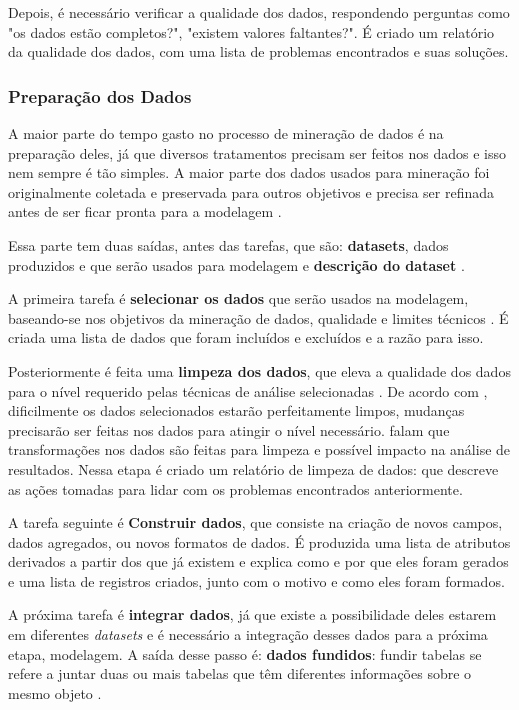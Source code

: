Depois, é necessário verificar a qualidade dos dados, respondendo perguntas como "os dados estão completos?", "existem valores faltantes?". É criado um relatório da qualidade dos dados, com uma lista de problemas encontrados e suas soluções.

\subsubsection{Preparação dos Dados}
A maior parte do tempo gasto no processo de mineração de dados é na preparação deles, já que diversos tratamentos precisam ser feitos nos dados e isso nem sempre é tão simples. A maior parte dos dados usados para mineração foi originalmente coletada e preservada para outros objetivos e precisa ser refinada antes de ser ficar pronta para a modelagem \citep{dmfd}.

Essa parte tem duas saídas, antes das tarefas, que são: \textbf{datasets}, dados produzidos e que serão usados para modelagem e \textbf{descrição do dataset} \citep{crispmanual}.

A primeira tarefa é \textbf{selecionar os dados} que serão usados na modelagem, baseando-se nos objetivos da mineração de dados, qualidade e limites técnicos \citep{crispmanual}. É criada uma lista de dados que foram incluídos e excluídos e a razão para isso.

Posteriormente é feita uma \textbf{limpeza dos dados}, que eleva a qualidade dos dados para o nível requerido pelas técnicas de análise selecionadas \citep{crispmanual}. De acordo com , dificilmente os dados selecionados estarão perfeitamente limpos, mudanças precisarão ser feitas nos dados para atingir o nível necessário.  falam que transformações nos dados são feitas para limpeza e possível impacto na análise de resultados. Nessa etapa é criado um relatório de limpeza de dados: que descreve as ações tomadas para lidar com os problemas encontrados anteriormente.

A tarefa seguinte é \textbf{Construir dados}, que consiste na criação de novos campos, dados agregados, ou novos formatos de dados. É produzida uma lista de atributos derivados a partir dos que já existem e explica como e por que eles foram gerados e uma lista de registros criados, junto com o motivo e como eles foram formados.

A próxima tarefa é \textbf{integrar dados}, já que existe a possibilidade deles estarem em diferentes \textit{datasets} e é necessário a integração desses dados para a próxima etapa, modelagem. A saída desse passo é: \textbf{dados fundidos}: fundir tabelas se refere a juntar duas ou mais tabelas que têm diferentes informações sobre o mesmo objeto \citep{crispmanual}. 

